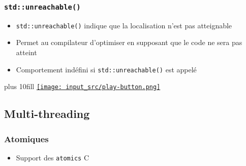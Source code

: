 \documentclass[C++.tex]{subfiles}
\begin{document}
\begin{frame}[fragile]
	\frametitle{\lstinline|std::unreachable()|}
	\begin{itemize}
		\item \lstinline|std::unreachable()| indique que la localisation n'est pas atteignable
		\item Permet au compilateur d'optimiser en supposant que le code ne sera pas atteint
		\item Comportement indéfini si \lstinline|std::unreachable()| est appelé
	\end{itemize}

	\vskip 10mm plus 10fill
	\hfill
	\href{https://godbolt.org/#g:!((g:!((g:!((h:codeEditor,i:(filename:'1',fontScale:14,fontUsePx:'0',j:1,lang:c%2B%2B,selection:(endColumn:1,endLineNumber:18,positionColumn:1,positionLineNumber:18,selectionStartColumn:1,selectionStartLineNumber:1,startColumn:1,startLineNumber:1),source:'%23include+%3Ciostream%3E%0A%23include+%3Cutility%3E%0A%0Aint+main()%0A%7B%0A++int+i+%3D+1%3B%0A%0A++if(i+%3E+0)%0A++%7B%0A++++std::cout+%3C%3C+%22OK%5Cn%22%3B%0A++%7D%0A++else%0A++%7B%0A++++std::unreachable()%3B%0A++++std::cout+%3C%3C+%22Unreachable%5Cn%22%3B%0A++%7D%0A%7D%0A'),l:'5',n:'0',o:'C%2B%2B+source+%231',t:'0')),k:50,l:'4',n:'0',o:'',s:0,t:'0'),(g:!((h:executor,i:(argsPanelShown:'1',compilationPanelShown:'0',compiler:g122,compilerName:'',compilerOutShown:'0',execArgs:'',execStdin:'',fontScale:14,fontUsePx:'0',j:1,lang:c%2B%2B,libs:!(),options:'-std%3Dc%2B%2B23+-Wall+-Wextra+-pedantic',source:1,stdinPanelShown:'1',wrap:'1'),l:'5',n:'0',o:'Executor+x86-64+gcc+12.2+(C%2B%2B,+Editor+%231)',t:'0')),header:(),k:50,l:'4',n:'0',o:'',s:0,t:'0')),l:'2',n:'0',o:'',t:'0')),version:4}{\texttt{[image: input\_src/play-button.png]}}
\end{frame}

\subsection*{Multi-threading}
\begin{frame}[fragile]
	\frametitle{Atomiques}
	\begin{itemize}
		\item Support des \lstinline|atomics| C
	\end{itemize}
\end{frame}
\end{document}
